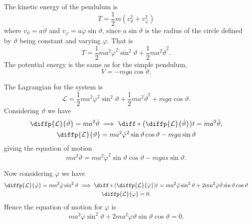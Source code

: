 \documentclass[fleqn]{NotesClass}
\newcommand*{\lagrangian}{\mathcal{L}}
\begin{document}
    The kinetic energy of the pendulum is
    \begin{equation}
        T = \frac{1}{2}m(v_{\vartheta}^2 + v_{\varphi}^2)
    \end{equation}
    where \(v_{\vartheta} = a\dot{\vartheta}\) and \(v_{\varphi} = a\dot{\varphi}\sin\vartheta\), since \(a\sin\vartheta\) is the radius of the circle defined by \(\vartheta\) being constant and varying \(\varphi\).
    That is
    \begin{equation}
        T = \frac{1}{2}ma^2\dot{\varphi}^2\sin^2\vartheta + \frac{1}{2}ma^2\dot{\vartheta}^2.
    \end{equation}
    The potential energy is the same as for the simple pendulum,
    \begin{equation}
        V = -mga\cos\vartheta.
    \end{equation}

    The Lagrangian for the system is
    \begin{equation}
        \lagrangian = \frac{1}{2}ma^2\dot{\varphi}^2\sin^2\vartheta + \frac{1}{2}ma^2\dot{\vartheta}^2 + mga\cos\vartheta.
    \end{equation}
    Considering \(\vartheta\) we have
    \begin{gather}
        \diffp{\lagrangian}{\dot{\vartheta}} = ma^2\dot{\vartheta} \implies \diff*{\left( \diffp{\lagrangian}{\dot{\vartheta}} \right)}{t} = ma^2\ddot{\vartheta},\\
        \diffp{\lagrangian}{\vartheta} = ma^2\dot{\varphi}^2\sin\vartheta\cos\vartheta - mga\sin\vartheta
    \end{gather}
    giving the equation of motion
    \begin{equation}\label{eqn:spheirical pendulum theta eom}
        ma^2\ddot{\vartheta} = ma^2\dot{\varphi}^2\sin\vartheta\cos\vartheta - mgas\sin\vartheta.
    \end{equation}
    
    Now considering \(\varphi\) we have
    \begin{gather}
        \diffp{\lagrangian}{\dot{\varphi}} = ma^2\dot\varphi\sin^2\vartheta \implies \diff*{\left( \diffp{\lagrangian}{\dot{\varphi}} \right)}{t} = ma^2\ddot{\varphi}\sin^2\vartheta +2ma^2\dot{\varphi}\dot{\vartheta}\sin\vartheta\cos\vartheta\\
        \diffp{\lagrangian}{\varphi} = 0.
    \end{gather}
    Hence the equation of motion for \(\varphi\) is
    \begin{equation}\label{eqn:spherical pendulum phi eom}
        ma^2\ddot{\varphi}\sin^2\vartheta +2ma^2\dot{\varphi}\dot{\vartheta}\sin\vartheta\cos\vartheta = 0.
    \end{equation}
    
\end{document}
